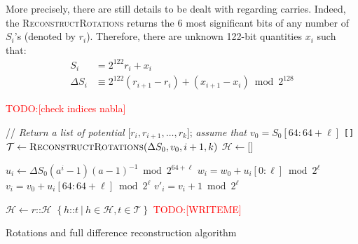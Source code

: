 \documentclass[submission,svgnames,journal=tosc]{iacrtrans}
\newcommand{\todo}[1]{\textcolor{red}{TODO:[#1]}}
\begin{document}
More precisely, there are still details to be dealt with regarding
carries. Indeed, the \textsc{ReconstructRotations} returns the 6 most
significant bits of any number of $S_i$'s (denoted by $r_i$). Therefore, there
are unknown 122-bit quantities $x_i$ such that:
\begin{align*}
  S_i &= 2^{122} r_i + x_i \\
  \Delta S_i &\equiv 2^{122} (r_{i+1} - r_i) + (x_{i+1} - x_{i}) \bmod 2^{128}
\end{align*}

\todo{check indices nabla}

\begin{algorithm}
\begin{algorithmic}[1]
 \State // \emph{Return a list of potential} $\texttt{[}r_i, r_{i+1}, \dots, r_k\texttt{]}$; \emph{assume that $v_0 = S_0[64:64+\ell]$}
  \State \Return \texttt{[]} 
  \EndIf
  \State $\mathcal{T} \gets \Call{ReconstructRotations}{\Delta S_0, v_0, i + 1, k}$ 
  \State $\mathcal{H} \gets \texttt{[]}$ 

  \State $u_i \gets \Delta S_0 (a^i-1)(a-1)^{-1} \bmod 2^{64+\ell}$ 
  \State $w_i = w_0 + u_i[0:\ell] \bmod 2^{\ell}$ 
  \State $v_i = v_0 + u_i[64:64+\ell] \bmod 2^{\ell}$ 
  \State $v'_i = v_i + 1 \bmod 2^{\ell}$

   
   
  \State $\mathcal{H} \gets r \texttt{::} \mathcal{H}$ 
  \EndIf
  \EndFor
  \State \Return $\left\{ h\texttt{::} t~|~ h \in \mathcal{H}, t \in \mathcal{T} \right\}$ 
  \EndFunction
  \State
  \State \todo{WRITEME}
  \EndFunction
\end{algorithmic}
\caption{Rotations and full difference reconstruction algorithm}
\label{algo:unknown_2}
\end{algorithm}



\end{document}
